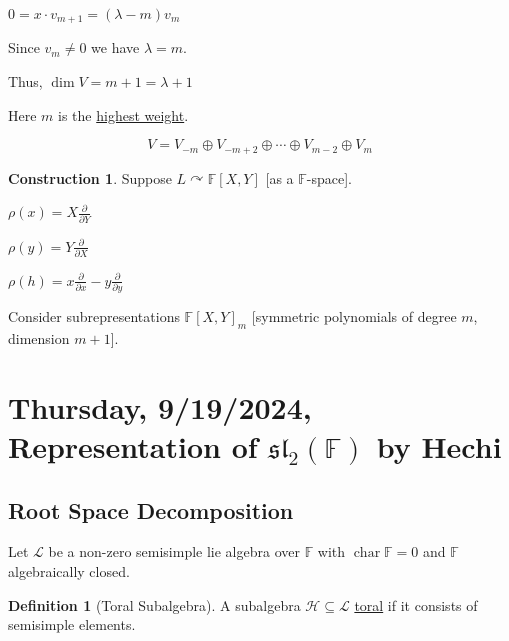 \documentclass{article}
\theoremstyle{definition}
\newtheorem*{definition}{Definition}
\newtheorem*{construction}{Construction}
\newcommand{\Char}{\operatorname{char}}
\begin{document}
\(0 = x \cdot v_{m+1} = (\lambda - m) v_m\) 

Since \(v_m \neq 0\) we have \(\lambda = m\).

Thus, \(\dim V = m+1 = \lambda + 1\)

Here \(m\) is the \underline{highest weight}. 

\[
    V = V_{-m} \oplus V_{-m + 2} \oplus \cdots \oplus V_{m-2} \oplus V_m
\]

\begin{construction}
    Suppose \(L \curvearrowright \mathbb{F}[X,Y]\) [as a \(\mathbb{F}\)-space].
    
    \(\rho (x) = X \frac{\partial}{\partial Y} \) 

    \(\rho (y) = Y \frac{\partial}{\partial X} \)
    
    \(\rho (h) = x \frac{\partial}{\partial x} - y \frac{\partial}{\partial y}\)
    
    Consider subrepresentations \(\mathbb{F} [X,Y]_m\) [symmetric polynomials of degree \(m\), dimension \(m+1\)].

    \begin{center}
    \end{center}

\end{construction}

\newpage

\section{Thursday, 9/19/2024, Representation of \(\mathfrak{sl}_2(\mathbb{F})\) by Hechi}

\subsection*{Root Space Decomposition}

Let \(\mathcal{L}\) be a non-zero semisimple lie algebra over \(\mathbb{F}\) with \(\Char \mathbb{F} = 0\) and \(\mathbb{F}\) algebraically closed.

\begin{definition}[Toral Subalgebra]
    A subalgebra \(\mathcal{H} \subseteq \mathcal{L}\) \underline{toral} if it consists of semisimple elements.
\end{definition}
\end{document}
